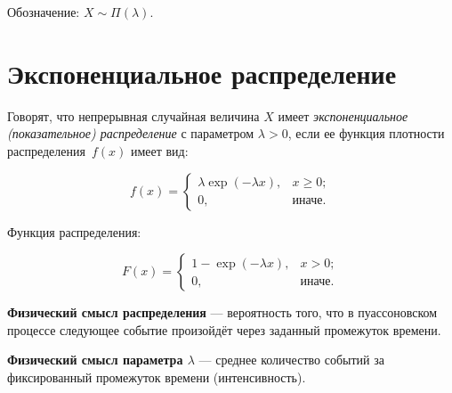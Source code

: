



Обозначение: $X \sim \Pi(\lambda)$.


\chapter{Экспоненциальное распределение} %

Говорят, что  непрерывная случайная величина $X$ имеет \textit{экспоненциальное (показательное) распределение} с параметром $\lambda > 0$, если ее функция плотности распределения~$f(x)$ имеет вид:

\begin{equation}
	f(x) =
	\begin{cases}
		\lambda \exp(-\lambda x), & x \ge 0;\\
		0,  & \text{иначе}.
	\end{cases}
\end{equation}

Функция распределения: 

\begin{equation}
	F(x) = 
	\begin{cases}
		1 - \exp(-\lambda x), & x > 0;\\
		0,  & \text{иначе}.
	\end{cases}
\end{equation}

\textbf{Физический смысл распределения} --- вероятность того, что в пуассоновском процессе следующее событие произойдёт через заданный промежуток времени.

\textbf{Физический смысл параметра $\lambda$} --- среднее количество событий за фиксированный промежуток времени (интенсивность).

